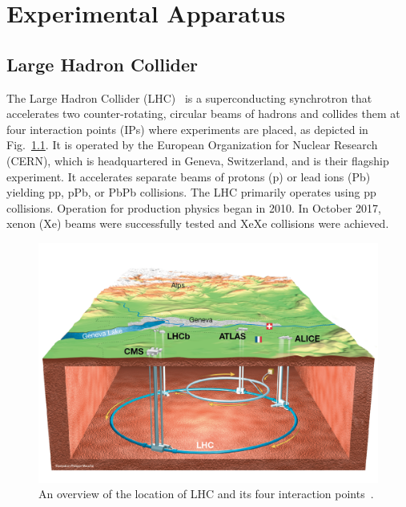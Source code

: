 \chapter{Experimental Apparatus}\label{ch:experiment}

\section{Large Hadron Collider}

The Large Hadron Collider (LHC)~\cite{Evans:2008zzb} is a superconducting synchrotron that accelerates two counter-rotating, circular beams of hadrons and collides them at four interaction points (IPs) where experiments are placed, as depicted in Fig.~\ref{lhc-overview}. It is operated by the European Organization for Nuclear Research (CERN), which is headquartered in Geneva, Switzerland, and is their flagship experiment.  It accelerates separate beams of protons (p) or lead ions (Pb) yielding pp, pPb, or PbPb collisions. The LHC primarily operates using pp collisions. Operation for production physics began in 2010. In October 2017, xenon (Xe) beams were successfully tested and XeXe collisions were achieved. 

\begin{figure}[!htb]
	\centering
	\includegraphics[scale=0.25]{figures/lhc_overview}
	\caption{An overview of the location of LHC and its four interaction points~\cite{Mouche:1708847}.}
	\label{lhc-overview}
\end{figure}

